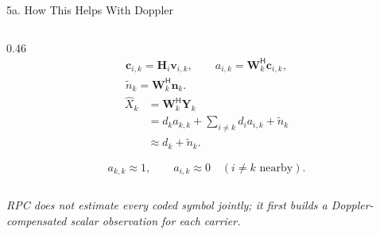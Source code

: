 \documentclass[aspectratio=169,10pt]{beamer}
\newcommand{\vY}{\bm{Y}}
\newcommand{\vc}{\bm{c}}
\newcommand{\vn}{\bm{n}}
\newcommand{\vv}{\bm{v}}
\newcommand{\vH}{\bm{H}}
\newcommand{\vW}{\bm{W}}
\newcommand{\hX}{\hat{X}}
\newcommand{\herm}{\mathsf{H}}
\begin{document}
\begin{frame}{5a. How This Helps With Doppler}
\begin{columns}[T,onlytextwidth]
    \begin{column}{0.46\textwidth}
      \vspace{-0.6em}
      \[
      \begin{gathered}
        \vc_{i,k}=\vH_i\vv_{i,k},\qquad
        a_{i,k}=\vW_k^{\herm}\vc_{i,k},\\[-1pt]
        \tilde n_k=\vW_k^{\herm}\vn_k .
      \end{gathered}
      \]
      \vspace{-0.7em}
      \[
      \begin{aligned}
        \hX_k
        &=\vW_k^{\herm}\vY_k\\
        &=d_k a_{k,k}
          +\sum_{i\ne k} d_i a_{i,k}
          +\tilde n_k\\
        &\approx d_k+\tilde n_k .
      \end{aligned}
      \]

      \vspace{-0.6em}
      \[
        a_{k,k}\approx 1,
        \qquad
        a_{i,k}\approx 0
        \quad (i\ne k \text{ nearby}).
      \]

      \vspace{-0.1em}
      \begin{center}
      \end{center}
    \end{column}
  \end{columns}

  \vspace{0.2em}
  \begin{center}
    {\itshape\footnotesize RPC does not estimate every coded symbol jointly; it first
    builds a Doppler-compensated scalar observation for each carrier.}
  \end{center}

\end{frame}
\end{document}
